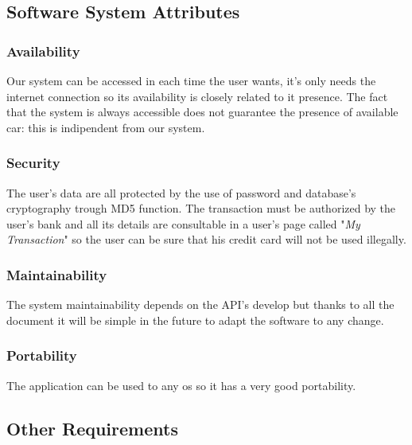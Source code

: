 \subsection{Software System Attributes} \label{sec:sw_sys_attr}
\subsubsection{Availability} \label{availability}
Our system can be accessed in each time the user wants, it's only needs the internet connection so its availability is closely related to it presence. The fact that the system is always accessible does not guarantee the presence of available car: this is indipendent from our system.

\subsubsection{Security} \label{security}
The user's data are all protected by the use of password and database's cryptography trough MD5 function. The transaction must be authorized by the user's bank and all its details are consultable in a user's page called "\textit{My Transaction}" so the user can be sure that his credit card will not be used illegally.

\subsubsection{Maintainability} \label{maintainability}
The system maintainability depends on the API's develop but thanks to all the document it will be simple in the future to adapt the software to any change.

\subsubsection{Portability} \label{portability}
The application can be used to any \acs{os} so it has a very good portability.

\subsection{Other Requirements} \label{other}
